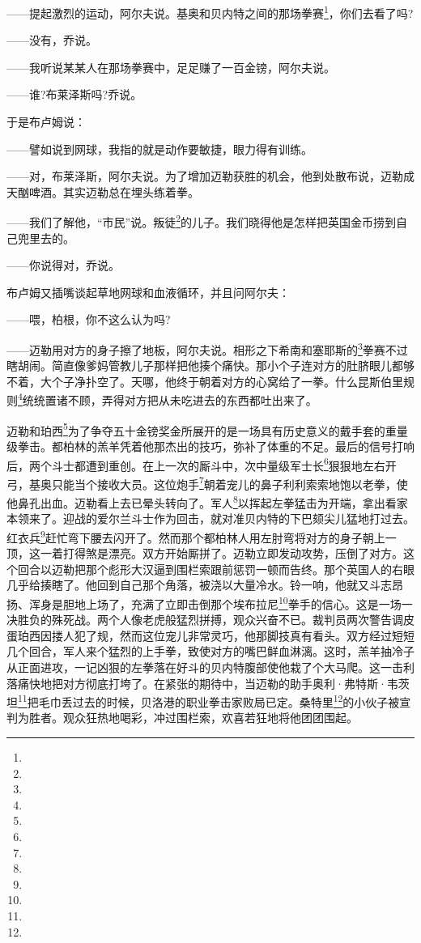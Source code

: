 \par ——提起激烈的运动，阿尔夫说。基奥和贝内特之间的那场拳赛\footnote{}，你们去看了吗?
\par ——没有，乔说。
\par ——我听说某某人在那场拳赛中，足足赚了一百金镑，阿尔夫说。
\par ——谁?布莱泽斯吗?乔说。
\par 于是布卢姆说：
\par ——譬如说到网球，我指的就是动作要敏捷，眼力得有训练。
\par ——对，布莱泽斯，阿尔夫说。为了增加迈勒获胜的机会，他到处散布说，迈勒成天酗啤酒。其实迈勒总在埋头练着拳。
\par ——我们了解他，“市民”说。叛徒\footnote{}的儿子。我们晓得他是怎样把英国金币捞到自己兜里去的。
\par ——你说得对，乔说。
\par 布卢姆又插嘴谈起草地网球和血液循环，并且问阿尔夫：
\par ——喂，柏根，你不这么认为吗?
\par ——迈勒用对方的身子擦了地板，阿尔夫说。相形之下希南和塞耶斯的\footnote{}拳赛不过瞎胡闹。简直像爹妈管教儿子那样把他揍个痛快。那小个子连对方的肚脐眼儿都够不着，大个子净扑空了。天哪，他终于朝着对方的心窝给了一拳。什么昆斯伯里规则\footnote{}统统置诸不顾，弄得对方把从未吃进去的东西都吐出来了。
\par 迈勒和珀西\footnote{}为了争夺五十金镑奖金所展开的是一场具有历史意义的戴手套的重量级拳击。都柏林的羔羊凭着他那杰出的技巧，弥补了体重的不足。最后的信号打响后，两个斗士都遭到重创。在上一次的厮斗中，次中量级军士长\footnote{}狠狠地左右开弓，基奥只能当个接收大员。这位炮手\footnote{}朝着宠儿的鼻子利利索索地饱以老拳，使他鼻孔出血。迈勒看上去已晕头转向了。军人\footnote{}以挥起左拳猛击为开端，拿出看家本领来了。迎战的爱尔兰斗士作为回击，就对准贝内特的下巴颏尖儿猛地打过去。红衣兵\footnote{}赶忙弯下腰去闪开了。然而那个都柏林人用左肘弯将对方的身子朝上一顶，这一着打得煞是漂亮。双方开始厮拼了。迈勒立即发动攻势，压倒了对方。这个回合以迈勒把那个彪形大汉逼到围栏索跟前惩罚一顿而告终。那个英国人的右眼几乎给揍瞎了。他回到自己那个角落，被浇以大量冷水。铃一响，他就又斗志昂扬、浑身是胆地上场了，充满了立即击倒那个埃布拉尼\footnote{}拳手的信心。这是一场一决胜负的殊死战。两个人像老虎般猛烈拼搏，观众兴奋不已。裁判员两次警告调皮蛋珀西因搂人犯了规，然而这位宠儿非常灵巧，他那脚技真有看头。双方经过短短几个回合，军人来个猛烈的上手拳，致使对方的嘴巴鲜血淋漓。这时，羔羊抽冷子从正面进攻，一记凶狠的左拳落在好斗的贝内特腹部使他栽了个大马爬。这一击利落痛快地把对方彻底打垮了。在紧张的期待中，当迈勒的助手奥利·弗特斯·韦茨坦\footnote{}把毛巾丢过去的时候，贝洛港的职业拳击家败局已定。桑特里\footnote{}的小伙子被宣判为胜者。观众狂热地喝彩，冲过围栏索，欢喜若狂地将他团团围起。
